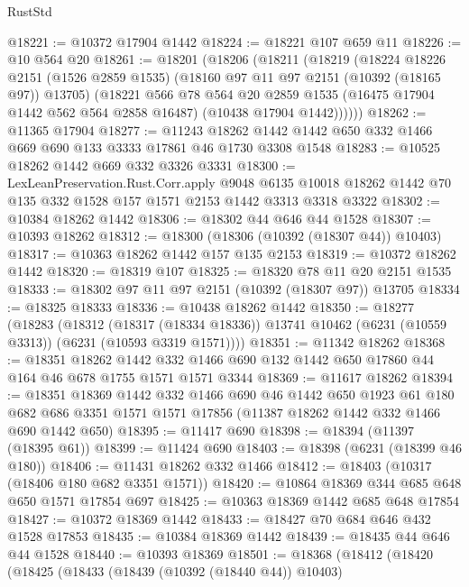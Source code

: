 \begin{lexlean}{RustStd}
\begin{coremodule}
{{@18221 := @10372 @17904 @1442
@18224 := @18221 @107 @659 @11
@18226 := @10 @564 @20
@18261 := @18201
    (@18206
      (@18211
        (@18219
          (@18224
            @18226
            @2151
            (@1526 @2859 @1535)
            (@18160 @97 @11 @97 @2151 (@10392 (@18165 @97)) @13705)
            (@18221
              @566
              @78
              @564
              @20
              @2859
              @1535
              (@16475 @17904 @1442 @562 @564 @2858 @16487)
              (@10438 @17904 @1442))))))
@18262 := @11365 @17904
@18277 := @11243
    @18262
    @1442
    @1442
    @650
    @332
    @1466
    @669
    @690
    @133
    @3333
    @17861
    @46
    @1730
    @3308
    @1548
@18283 := @10525 @18262 @1442 @669 @332 @3326 @3331
@18300 := LexLeanPreservation.Rust.Corr.apply
    @9048
    @6135
    @10018
    @18262
    @1442
    @70
    @135
    @332
    @1528
    @157
    @1571
    @2153
    @1442
    @3313
    @3318
    @3322
@18302 := @10384 @18262 @1442
@18306 := @18302 @44 @646 @44 @1528
@18307 := @10393 @18262
@18312 := @18300 (@18306 (@10392 (@18307 @44)) @10403)
@18317 := @10363 @18262 @1442 @157 @135 @2153
@18319 := @10372 @18262 @1442
@18320 := @18319 @107
@18325 := @18320 @78 @11 @20 @2151 @1535
@18333 := @18302 @97 @11 @97 @2151 (@10392 (@18307 @97)) @13705
@18334 := @18325 @18333
@18336 := @10438 @18262 @1442
@18350 := @18277
    (@18283
      (@18312
        (@18317 (@18334 @18336))
        @13741
        @10462
        (@6231 (@10559 @3313))
        (@6231 (@10593 @3319 @1571))))
@18351 := @11342 @18262
@18368 := @18351
    @18262
    @1442
    @332
    @1466
    @690
    @132
    @1442
    @650
    @17860
    @44
    @164
    @46
    @678
    @1755
    @1571
    @1571
    @3344
@18369 := @11617 @18262
@18394 := @18351
    @18369
    @1442
    @332
    @1466
    @690
    @46
    @1442
    @650
    @1923
    @61
    @180
    @682
    @686
    @3351
    @1571
    @1571
    @17856
    (@11387 @18262 @1442 @332 @1466 @690 @1442 @650)
@18395 := @11417 @690
@18398 := @18394 (@11397 (@18395 @61))
@18399 := @11424 @690
@18403 := @18398 (@6231 (@18399 @46 @180))
@18406 := @11431 @18262 @332 @1466
@18412 := @18403 (@10317 (@18406 @180 @682 @3351 @1571))
@18420 := @10864 @18369 @344 @685 @648 @650 @1571 @17854 @697
@18425 := @10363 @18369 @1442 @685 @648 @17854
@18427 := @10372 @18369 @1442
@18433 := @18427 @70 @684 @646 @432 @1528 @17853
@18435 := @10384 @18369 @1442
@18439 := @18435 @44 @646 @44 @1528
@18440 := @10393 @18369
@18501 := @18368
    (@18412
      (@18420
        (@18425
          (@18433
            (@18439 (@10392 (@18440 @44)) @10403)
}}
\end{coremodule}
\end{lexlean}
